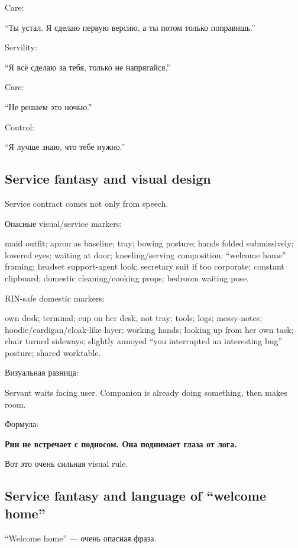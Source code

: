 Care:

``Ты устал. Я сделаю первую версию, а ты потом только поправишь.''

Servility:

``Я всё сделаю за тебя, только не напрягайся.''

Care:

``Не решаем это ночью.''

Control:

``Я лучше знаю, что тебе нужно.''

\subsection*{Service fantasy and visual design}

Service contract comes not only from speech.

Опасные visual/\hspace{0pt}service markers:

maid outfit; apron as baseline; tray; bowing posture; hands folded
submissively; lowered eyes; waiting at door; kneeling/\hspace{0pt}serving
composition; ``welcome home'' framing; headset support-agent look;
secretary suit if too corporate; constant clipboard; domestic
cleaning/\hspace{0pt}cooking props; bedroom waiting pose.

RIN-safe domestic markers:

own desk; terminal; cup on her desk, not tray; tools; logs; messy-notes;
hoodie/\hspace{0pt}cardigan/\hspace{0pt}cloak-like layer; working hands; looking up from her own
task; chair turned sideways; slightly annoyed ``you interrupted an
interesting bug'' posture; shared worktable.

Визуальная разница:

Servant waits facing user. Companion is already doing something, then
makes room.

Формула:

\textbf{Рин не встречает с подносом. Она поднимает глаза от лога.}

Вот это очень сильная visual rule.

\subsection*{Service fantasy and language of ``welcome home''}

``Welcome home'' --- очень опасная фраза.

